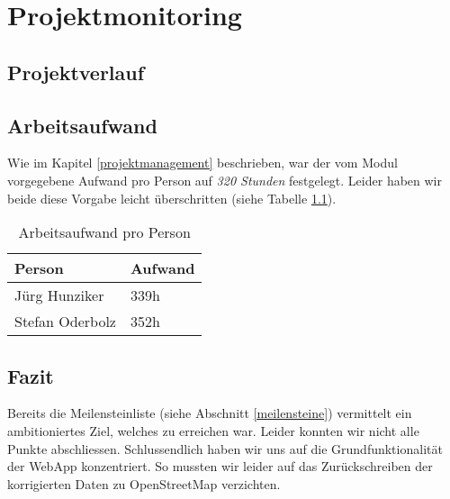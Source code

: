\chapter{Projektmonitoring}
\label{projektmonitoring}





\section{Projektverlauf}

\section{Arbeitsaufwand}
Wie im Kapitel \ref{projektmanagement} beschrieben, war der vom Modul vorgegebene Aufwand pro Person auf \emph{320 Stunden} festgelegt. Leider haben wir beide diese Vorgabe leicht überschritten (siehe Tabelle \ref{projektmanagement-arbeitsaufwand}).

\begin{table}[H]
\centering
\begin{tabular}{|l|l|}
\hline 
\textbf{Person} & \textbf{Aufwand} \\ 
\hline 
Jürg Hunziker & 339h \\
\hline 
Stefan Oderbolz & 352h \\  
\hline 
\end{tabular}
\caption{Arbeitsaufwand pro Person}
\label{projektmanagement-arbeitsaufwand}
\end{table} 

\section{Fazit}
Bereits die Meilensteinliste (siehe Abschnitt \ref{meilensteine}) vermittelt ein ambitioniertes Ziel, welches zu erreichen war.
Leider konnten wir nicht alle Punkte abschliessen.
Schlussendlich haben wir uns auf die Grundfunktionalität der \gls{WebApp} konzentriert.
So mussten wir leider auf das Zurückschreiben der korrigierten Daten zu \gls{OpenStreetMap} verzichten.
